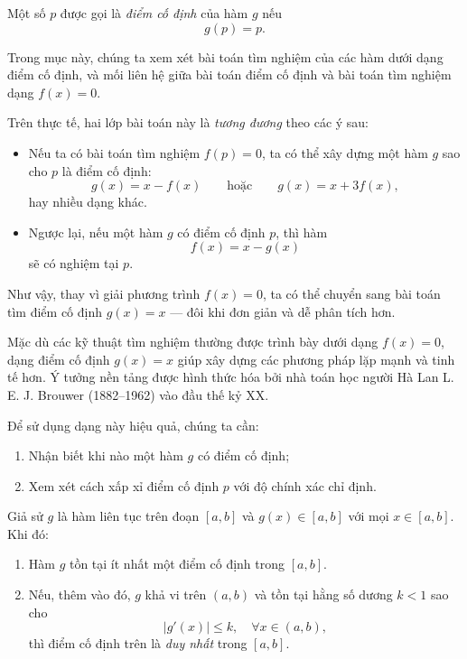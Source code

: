 \begin{definition}
\label{def:fixed_point}
Một số $p$ được gọi là \emph{điểm cố định} của hàm $g$ nếu
\[
g(p) = p.
\]
\end{definition}

Trong mục này, chúng ta xem xét bài toán tìm nghiệm của các hàm dưới dạng điểm cố định,
và mối liên hệ giữa bài toán điểm cố định và bài toán tìm nghiệm dạng $f(x)=0$.

Trên thực tế, hai lớp bài toán này là \emph{tương đương} theo các ý sau:

\begin{itemize}
    \item Nếu ta có bài toán tìm nghiệm $f(p)=0$, ta có thể xây dựng
    một hàm $g$ sao cho $p$ là điểm cố định:
    \[
    g(x) = x - f(x)
    \qquad \text{hoặc} \qquad
    g(x) = x + 3f(x),
    \]
    hay nhiều dạng khác.
    \item Ngược lại, nếu một hàm $g$ có điểm cố định $p$, thì hàm
    \[
    f(x) = x - g(x)
    \]
    sẽ có nghiệm tại $p$.
\end{itemize}

Như vậy, thay vì giải phương trình $f(x)=0$, ta có thể chuyển sang bài toán
tìm điểm cố định $g(x)=x$ — đôi khi đơn giản và dễ phân tích hơn.

\begin{remark}
Mặc dù các kỹ thuật tìm nghiệm thường được trình bày dưới dạng $f(x)=0$,
dạng điểm cố định $g(x)=x$ giúp xây dựng các phương pháp lặp mạnh và tinh tế hơn.
Ý tưởng nền tảng được hình thức hóa bởi nhà toán học người Hà Lan
L. E. J. Brouwer (1882–1962) vào đầu thế kỷ XX.
\end{remark}

Để sử dụng dạng này hiệu quả, chúng ta cần:
\begin{enumerate}
    \item Nhận biết khi nào một hàm $g$ có điểm cố định;
    \item Xem xét cách xấp xỉ điểm cố định $p$ với độ chính xác chỉ định.
\end{enumerate}

\begin{theorem}
\label{thm:fixed_point_existence_uniqueness}
Giả sử $g$ là hàm liên tục trên đoạn $[a,b]$ và $g(x) \in [a,b]$ với mọi $x \in [a,b]$.
Khi đó:
\begin{enumerate}
    \item Hàm $g$ tồn tại ít nhất một điểm cố định trong $[a,b]$.
    \item Nếu, thêm vào đó, $g$ khả vi trên $(a,b)$ và tồn tại hằng số dương $k<1$
    sao cho
    \[
    |g'(x)| \le k, \quad \forall x \in (a,b),
    \]
    thì điểm cố định trên là \emph{duy nhất} trong $[a,b]$.
\end{enumerate}
\end{theorem}


